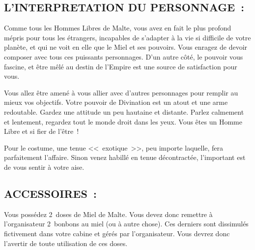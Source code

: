 \documentclass[14pt,twocolumn]{extarticle}
\begin{document}
\subsection{L'INTERPRETATION DU PERSONNAGE~:}

Comme tous les Hommes Libres de Malte, vous avez en fait le plus profond mépris
pour tous les étrangers, incapables de s'adapter à la vie si difficile de votre
planète, et qui ne voit en elle que le Miel et ses pouvoirs. Vous enragez de
devoir composer avec tous ces puissants personnages. D'un autre côté, le
pouvoir vous fascine, et être mêlé au destin de l'Empire est une source de
satisfaction pour vous. 

Vous allez être amené à vous allier avec d'autres personnages pour remplir au
mieux vos objectifs. Votre pouvoir de Divination est un atout et une arme
redoutable. Gardez une attitude un peu hautaine et distante. Parlez calmement
et lentement, regardez tout le monde droit dans les yeux. Vous êtes un Homme
Libre et si fier de l'être~!

Pour le costume, une tenue <<~exotique~>>, peu importe laquelle, fera
parfaitement l'affaire. Sinon venez habillé en tenue décontractée, l'important
est de vous sentir à votre aise.

\subsection{ACCESSOIRES~:}

Vous possédez 2~doses de Miel de Malte. Vous devez donc remettre à
l'organisateur 2~bonbons au miel (ou à autre chose). Ces derniers sont
dissimulés fictivement dans votre cabine et gérés par l'organisateur. Vous
devrez donc l'avertir de toute utilisation de ces doses. 
\end{document}
